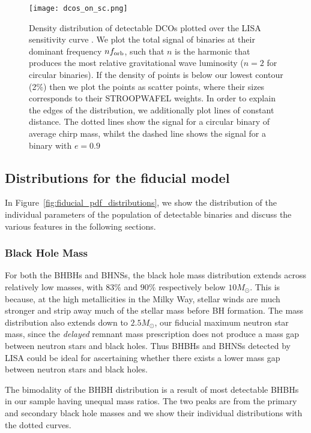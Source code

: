 \begin{figure*}[t]
    \centering
    \texttt{[image: dcos\_on\_sc.png]}
    \caption{Density distribution of detectable DCOs plotted over the LISA sensitivity curve \citep{Robson+2019}. We plot the total signal of binaries at their dominant frequency $n f_{\rm orb}$, such that $n$ is the harmonic that produces the most relative gravitational wave luminosity ($n = 2$ for circular binaries). If the density of points is below our lowest contour (2\%) then we plot the points as scatter points, where their sizes corresponds to their STROOPWAFEL weights. In order to explain the edges of the distribution, we additionally plot lines of constant distance. The dotted lines show the signal for a circular binary of average chirp mass, whilst the dashed line shows the signal for a binary with $e = 0.9$}
    \label{fig:dcos_on_sc}
\end{figure*}


\subsection{Distributions for the fiducial model}\label{sec:fiducial_distributions}

In Figure~\ref{fig:fiducial_pdf_distributions}, we show the distribution of the individual parameters of the population of detectable binaries and discuss the various features in the following sections.

\subsubsection{Black Hole Mass}
For both the BHBHs and BHNSs, the black hole mass distribution extends across relatively low masses, with $83\%$ and $90\%$ respectively below $10 \unit{M_{\odot}}$. This is because, at the high metallicities in the Milky Way, stellar winds are much stronger and strip away much of the stellar mass before BH formation. The mass distribution also extends down to $2.5 \unit{M_{\odot}}$, our fiducial maximum neutron star mass, since the \citet{Fryer+2012} \textit{delayed} remnant mass prescription does not produce a mass gap between neutron stars and black holes. Thus BHBHs and BHNSs detected by LISA could be ideal for ascertaining whether there exists a lower mass gap between neutron stars and black holes.

The bimodality of the BHBH distribution is a result of most detectable BHBHs in our sample having unequal mass ratios. The two peaks are from the primary and secondary black hole masses and we show their individual distributions with the dotted curves.

